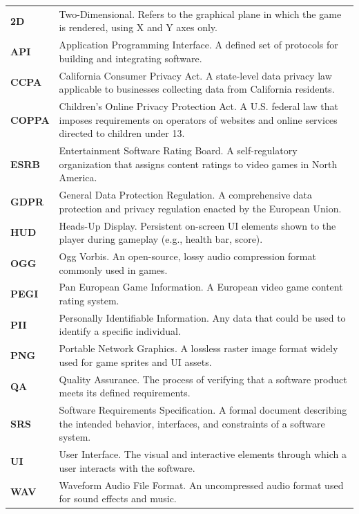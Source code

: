 \documentclass[12pt, letterpaper]{article}
\begin{document}
\begin{longtable}{>{\bfseries}p{3cm} p{10.5cm}}
    2D          & Two-Dimensional. Refers to the graphical plane in which the game is rendered, using X and Y axes only. \\
    \addlinespace
    API         & Application Programming Interface. A defined set of protocols for building and integrating software. \\
    \addlinespace
    CCPA        & California Consumer Privacy Act. A state-level data privacy law applicable to businesses collecting data from California residents. \\
    \addlinespace
    COPPA       & Children's Online Privacy Protection Act. A U.S. federal law that imposes requirements on operators of websites and online services directed to children under 13. \\
    \addlinespace
    ESRB        & Entertainment Software Rating Board. A self-regulatory organization that assigns content ratings to video games in North America. \\
    \addlinespace
    GDPR        & General Data Protection Regulation. A comprehensive data protection and privacy regulation enacted by the European Union. \\
    \addlinespace
    HUD         & Heads-Up Display. Persistent on-screen UI elements shown to the player during gameplay (e.g., health bar, score). \\
    \addlinespace
    OGG         & Ogg Vorbis. An open-source, lossy audio compression format commonly used in games. \\
    \addlinespace
    PEGI        & Pan European Game Information. A European video game content rating system. \\
    \addlinespace
    PII         & Personally Identifiable Information. Any data that could be used to identify a specific individual. \\
    \addlinespace
    PNG         & Portable Network Graphics. A lossless raster image format widely used for game sprites and UI assets. \\
    \addlinespace
    QA          & Quality Assurance. The process of verifying that a software product meets its defined requirements. \\
    \addlinespace
    SRS         & Software Requirements Specification. A formal document describing the intended behavior, interfaces, and constraints of a software system. \\
    \addlinespace
    UI          & User Interface. The visual and interactive elements through which a user interacts with the software. \\
    \addlinespace
    WAV         & Waveform Audio File Format. An uncompressed audio format used for sound effects and music. \\

\end{longtable}
\end{document}
